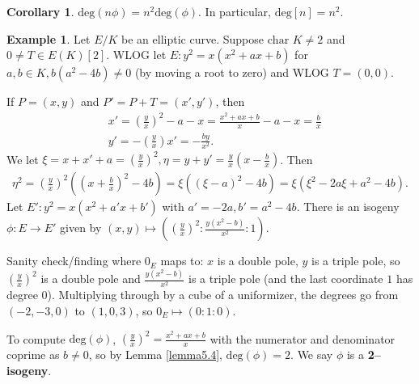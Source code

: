 \documentclass{article}
\theoremstyle{definition}
\newtheorem{cor}[theorem]{Corollary}
\newtheorem{example}{Example}[section]
\begin{document}
\begin{cor}\label{cor5.9}
    $\text{deg}(n \phi) = n^2 \text{deg}(\phi)$. In particular, $\text{deg}[n] = n^2$.
\end{cor}
\begin{example}
    Let $E/K$ be an elliptic curve. Suppose $\text{char }K\neq 2$ and $0\neq T \in E(K)[2]$. WLOG let $E: y^2 = x(x^2+ax+b)$ for $a,b \in K, b(a^2-4b)\neq 0$ (by moving a root to zero) and WLOG $T=(0,0)$. 
    \vspace{1mm}
     
    If $P = (x,y)$ and $P' = P+T = (x',y')$, then 
    \begin{align*}
        &x' = \left(\frac{y}{x}\right)^2-a-x = \frac{x^2+ax+b}{x}-a-x = \frac{b}{x}\\
        &y' = -\left(\frac{y}{x}\right)x' = -\frac{by}{x^2}.
    \end{align*}
    We let $\xi = x + x' + a = \left(\frac{y}{x}\right)^2, \eta = y + y' = \frac{y}{x}\left(x-\frac{b}{x}\right)$.
    Then 
    \begin{align*}
        \eta^2 = \left(\frac{y}{x}\right)^2\left(\left(x+\frac{b}{x}\right)^2-4b \right) = \xi((\xi-a)^2-4b) = \xi(\xi^2-2a\xi + a^2-4b).
    \end{align*}
    Let $E' : y^2 = x(x^2+a'x+b')$ with $a'=-2a, b' = a^2-4b$. There is an isogeny $\phi : E \to E'$ given by $(x,y) \mapsto \left(\left(\frac{y}{x}\right)^2 : \frac{y(x^2-b)}{x^2} : 1 \right)$.
    \vspace{1mm}
     
    Sanity check/finding where $0_E$ maps to: $x$ is a double pole, $y$ is a triple pole, so $\left(\frac{y}{x}\right)^2$ is a double pole and $\frac{y(x^2-b)}{x^2}$ is a triple pole (and the last coordinate $1$ has degree 0). Multiplying through by a cube of a uniformizer, the degrees go from $(-2,-3,0)$ to $(1,0,3)$, so $0_E \mapsto (0:1:0)$.
    \vspace{1mm}
     
    To compute $\text{deg}(\phi)$, $\left(\frac{y}{x}\right)^2 = \frac{x^2+ax+b}{x}$ with the numerator and denominator coprime as $b \neq 0$, so by Lemma \ref{lemma5.4}, $\text{deg}(\phi)=2$. We say $\phi$ is a \textbf{2--isogeny}.
\end{example}
\end{document}
